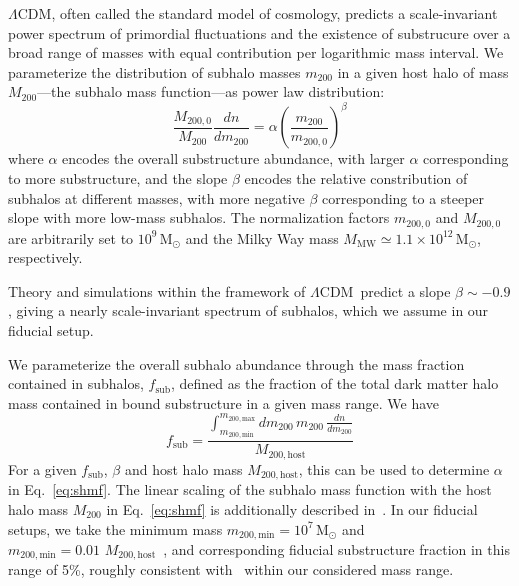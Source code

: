 \documentclass[twocolumn]{aastex62}
\newcommand{\acronym}[1]{{\small{#1}}}
\newcommand{\lcdm}{\acronym{$\Lambda$CDM}}
\newcommand{\Msun}{\textrm{M}_\odot}
\newcommand{\mtwo}{m_{200}}
\newcommand{\MMW}{M_\textrm{MW}}
\newcommand{\Mtwo}{M_{200}}
\begin{document}
 \lcdm, often called the standard model of cosmology, predicts a scale-invariant power spectrum of primordial fluctuations and the existence of substrucure over a broad range of masses with equal contribution per logarithmic mass interval. We parameterize the distribution of subhalo masses $\mtwo$ in a given host halo of mass $\Mtwo$---the subhalo mass function---as power law distribution:
\begin{equation}
\frac{M_{200,0}}{\Mtwo}\frac{dn}{d\mtwo} = \alpha\left(\frac{\mtwo}{m_{200, 0}}\right)^{\beta}
\label{eq:shmf}
\end{equation}
where $\alpha$ encodes the overall substructure abundance, with larger $\alpha$ corresponding to more substructure, and the slope $\beta$ encodes the relative constribution of subhalos at different masses, with more negative $\beta$ corresponding to a steeper slope with more low-mass subhalos. The normalization factors $m_{200, 0}$ and $M_{200, 0}$ are arbitrarily set to $10^9\,\Msun$ and the Milky Way mass $\MMW \simeq 1.1\times10^{12}\,\Msun$, respectively.

Theory and simulations within the framework of \lcdm~predict a slope $\beta\sim-0.9$, giving a nearly scale-invariant spectrum of subhalos, which we assume in our fiducial setup. 

We parameterize the overall subhalo abundance through the mass fraction contained in subhalos, $f_\mathrm{sub}$, defined as the fraction of the total dark matter halo mass contained in bound substructure in a given mass range. We have
\begin{equation}
f_\mathrm{sub} = \frac{\int_{m_\mathrm{200, min}}^{m_\mathrm{200, max}}d\mtwo\,\mtwo\,\frac{dn}{d\mtwo}}{M_\mathrm{200,host}}
\end{equation}
For a given $f_\mathrm{sub}$, $\beta$ and host halo mass $M_\mathrm{200,host}$, this can be used to determine $\alpha$ in Eq.~\ref{eq:shmf}. The linear scaling of the subhalo mass function with the host halo mass $\Mtwo$ in Eq.~\ref{eq:shmf} is additionally described in~\citet{2016MNRAS.457.1208H,2017MNRAS.469.1997D}. In our fiducial setups, we take the minimum mass $m_\mathrm{200, min} = 10^7\,\Msun$ and $m_\mathrm{200, min} = 0.01\,\,M_\mathrm{200,host}$~\citep{2017MNRAS.469.1997D,2018PhRvD..97l3002H}, and corresponding fiducial substructure fraction in this range of 5\%, roughly consistent with~\citet{2018PhRvD..97l3002H,2019arXiv190504182H,2002ApJ...572...25D} within our considered mass range.
\end{document}
